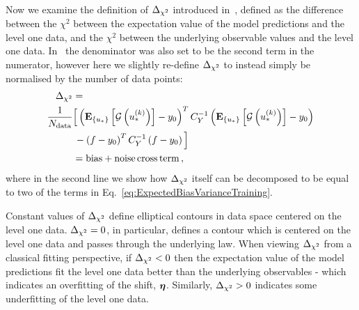 Now we examine the definition of $\Delta_{\chi^2}$ introduced
in~\cite{nnpdf30}, defined as the difference between the
$\chi^2$ between the expectation value of the model predictions and the level
one data, and the $\chi^2$ between the underlying observable values and the
level one data. In~\cite{nnpdf30} the denominator was also set to be the
second term in the numerator, however here we slightly re-define
$\Delta_{\chi^2}$ to instead simply be normalised by the number of data points:
\begin{equation}\label{eq:deltachi2def1}
    \begin{split}
        \Delta_{\chi^2} &= \\
            \frac{1}{N_{\rm data}} & \Big[ \left( \mathbf{E}_{\{ u_* \}} \left[ \mathcal{G}\left(u_*^{(k)}\right) \right] - y_0 \right)^T
            C_{Y}^{-1}
            \left( \mathbf{E}_{\{ u_* \}} \left[ \mathcal{G}\left(u_*^{(k)}\right) \right] - y_0 \right) \\
            & \, - \left( f - y_0 \right)^T
            C_{Y}^{-1}
            \left( f - y_0 \right)
        \Big] \\
        &= {\rm bias} + {\rm noise \, cross \, term} \, ,
    \end{split}
\end{equation}
where in the second line we show how $\Delta_{\chi^2}$ itself can be decomposed to
be equal to two of the terms in Eq.~\ref{eq:ExpectedBiasVarianceTraining}.

Constant values of $\Delta_{\chi^2}$ define elliptical contours in data space
centered on the level one data. $\Delta_{\chi^2} = 0$, in particular, defines a
contour which is centered on the level one data and passes through the
underlying law. When viewing $\Delta_{\chi^2}$ from a classical fitting perspective,
if $\Delta_{\chi^2} < 0$ then the expectation value of the model
predictions fit the level one data better than the underlying observables -
which indicates an overfitting of the shift, $\boldsymbol{\eta}$. Similarly,
$\Delta_{\chi^2} > 0$ indicates some underfitting of the level one data.

